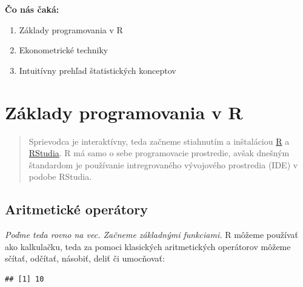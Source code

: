 \textbf{Čo nás čaká:}

\begin{enumerate}
\def\labelenumi{\arabic{enumi}.}
\tightlist
\item
  Základy programovania v R
\item
  Ekonometrické techniky
\item
  Intuitívny prehľad štatistických konceptov
\end{enumerate}

\newpage

\hypertarget{zuxe1klady-programovania-v-r}{%
\section{Základy programovania v R}\label{zuxe1klady-programovania-v-r}}

\begin{quote}
Sprievodca je interaktívny, teda začneme stiahnutím a inštaláciou
\href{https://cran.r-project.org/mirrors.html}{R} a
\href{https://cran.r-project.org/mirrors.html}{RStudia}. R má samo o
sebe programovacie prostredie, avšak dnešným štandardom je používanie
intregrovaného vývojového prostredia (IDE) v podobe RStudia.
\end{quote}

\hypertarget{aritmetickuxe9-operuxe1tory}{%
\subsection{Aritmetické operátory}\label{aritmetickuxe9-operuxe1tory}}

\emph{Poďme teda rovno na vec. Začneme základnými funkciami.} R môžeme
používať ako kalkulačku, teda za pomoci klasických aritmetických
operátorov môžeme sčítať, odčítať, násobiť, deliť či umocňovať:

\begin{Shaded}
\begin{Highlighting}[]
 \OperatorTok{+}\StringTok{ }
\end{Highlighting}
\end{Shaded}

\begin{verbatim}
## [1] 10
\end{verbatim}

\begin{Shaded}
\begin{Highlighting}[]
 \OperatorTok{-}\StringTok{ }
\end{Highlighting}
\end{Shaded}

